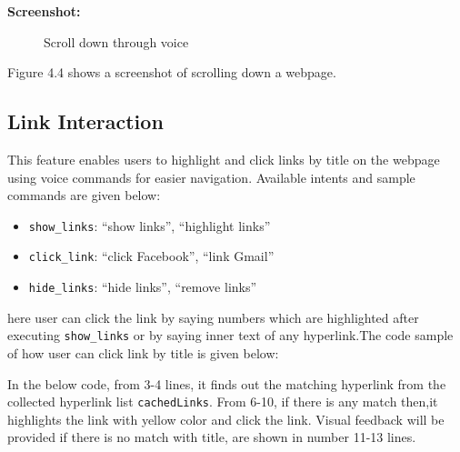 \textbf{Screenshot:}

\begin{figure}[H] 
    \centering
    \caption{Scroll down through voice}
    \label{fig:scroll_down}
\end{figure}

Figure 4.4 shows a screenshot of scrolling down a webpage.

\subsection{Link Interaction}
This feature enables users to highlight and click links by title on the webpage using voice commands for easier navigation. Available intents and sample commands are given below:

\begin{itemize}
    \item \texttt{show\_links}: ``show links'', ``highlight links''
    \item \texttt{click\_link}: ``click Facebook'', ``link Gmail''
    \item \texttt{hide\_links}: ``hide links'', ``remove links''
\end{itemize}

here user can click the link by saying numbers which are highlighted 
after executing \texttt{show\_links} or by saying inner text of any hyperlink.The code sample of how user can click link by title is given below:

In the below code, from 3-4 lines, it finds out the matching hyperlink from the collected hyperlink list \texttt{cachedLinks}. From 6-10, if there is any match then,it highlights the link with yellow color and click the link. Visual feedback will be provided if there is no match with title, are shown in number 11-13 lines. 

